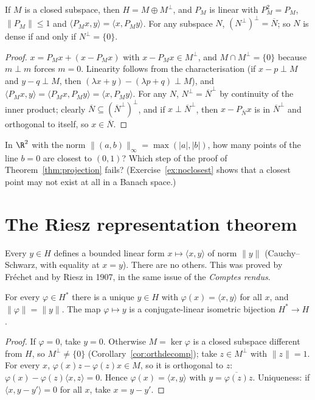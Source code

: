 \begin{corollary}\label{cor:orthdecomp}
If $M$ is a closed subspace, then $H=M\oplus M^\perp$, and $P_M$ is linear with $P_M^2=P_M$, $\|P_M\|\le1$ and $\langle P_Mx,y\rangle=\langle x,P_My\rangle$. For any subspace $N$, $(N^\perp)^\perp=\overline N$; so $N$ is dense if and only if
$N^\perp=\{0\}$.
\end{corollary}
\begin{proof}
$x=P_Mx+(x-P_Mx)$ with $x-P_Mx\in M^\perp$, and $M\cap M^\perp=\{0\}$ because $m\perp m$ forces $m=0$. Linearity follows from the characterisation (if $x-p\perp M$ and $y-q\perp M$, then $(\lambda x+y)-(\lambda p+q)\perp M$), and
$\langle P_Mx,y\rangle=\langle P_Mx,P_My\rangle=\langle x,P_My\rangle$. For any $N$, $N^\perp=\overline N^\perp$ by continuity of the inner product; clearly $\overline N\subseteq(\overline N^\perp)^\perp$, and if $x\perp\overline N^\perp$, then $x-P_{\overline N}x$ is in
$\overline N^\perp$ and orthogonal to itself, so $x\in\overline N$.
\end{proof}

\begin{think}
In $\R^2$ with the norm $\|(a,b)\|_\infty=\max(|a|,|b|)$, how many points of the line $b=0$ are closest to $(0,1)$? Which step of the proof of Theorem~\ref{thm:projection} fails? (Exercise~\ref{ex:noclosest} shows that a closest
point may not exist at all in a Banach space.)
\end{think}

\section{The Riesz representation theorem}

Every $y\in H$ defines a bounded linear form $x\mapsto\langle x,y\rangle$ of norm $\|y\|$ (Cauchy--Schwarz, with equality at $x=y$). There are no others. This was proved by Fr\'echet and by Riesz in 1907, in the same issue of the
\emph{Comptes rendus}.

\begin{theorem}\label{thm:rieszrep}
For every $\varphi\in H^*$ there is a unique $y\in H$ with $\varphi(x)=\langle x,y\rangle$ for all $x$, and $\|\varphi\|=\|y\|$. The map $\varphi\mapsto y$ is a conjugate-linear isometric bijection $H^*\to H$.
\end{theorem}
\begin{proof}
If $\varphi=0$, take $y=0$. Otherwise $M=\ker\varphi$ is a closed subspace different from $H$, so $M^\perp\ne\{0\}$ (Corollary~\ref{cor:orthdecomp}); take $z\in M^\perp$ with $\|z\|=1$. For every $x$, $\varphi(x)z-\varphi(z)x\in M$, so it is orthogonal to $z$:
$\varphi(x)-\varphi(z)\langle x,z\rangle=0$. Hence $\varphi(x)=\langle x,y\rangle$ with $y=\overline{\varphi(z)}z$. Uniqueness: if $\langle x,y-y'\rangle=0$ for all $x$, take $x=y-y'$.
\end{proof}

